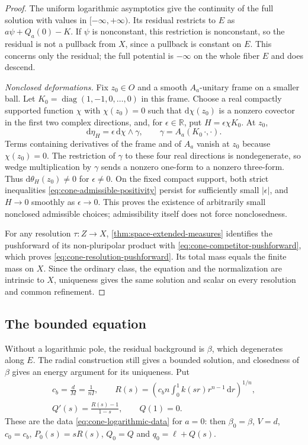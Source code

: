 \begin{proof}
The uniform logarithmic asymptotics give the continuity of the full solution with values in $[-\infty,+\infty)$. Its residual restricts to $E$ as $a\psi+Q_a(0)-K$. If $\psi$ is nonconstant, this restriction is nonconstant, so the residual is not a pullback from $X$, since a pullback is constant on $E$. This concerns only the residual; the full potential is $-\infty$ on the whole fiber $E$ and does descend.

\emph{Nonclosed deformations.} Fix $z_0\in O$ and a smooth $A_a$-unitary frame on a smaller ball. Let $K_0=\operatorname{diag}(1,-1,0,\ldots,0)$ in this frame. Choose a real compactly supported function $\chi$ with $\chi(z_0)=0$ such that $\mathrm{d}\chi(z_0)$ is a nonzero covector in the first two complex directions, and, for $\epsilon\in\mathbb R$, put $H=\epsilon\chi K_0$. At $z_0$,
\[
\mathrm{d}\eta_H=\epsilon\,\mathrm{d}\chi\wedge\gamma,\qquad \gamma=A_a(K_0\,\cdot,\cdot).
\]
Terms containing derivatives of the frame and of $A_a$ vanish at $z_0$ because $\chi(z_0)=0$. The restriction of $\gamma$ to these four real directions is nondegenerate, so wedge multiplication by $\gamma$ sends a nonzero one-form to a nonzero three-form. Thus $\mathrm{d}\theta_H(z_0)\ne0$ for $\epsilon\ne0$. On the fixed compact support, both strict inequalities \eqref{eq:cone-admissible-positivity} persist for sufficiently small $|\epsilon|$, and $H\to0$ smoothly as $\epsilon\to0$. This proves the existence of arbitrarily small nonclosed admissible choices; admissibility itself does not force nonclosedness.

For any resolution $\tau\colon Z\to X$, \cref{thm:space-extended-measures} identifies the pushforward of its non-pluripolar product with \eqref{eq:cone-competitor-pushforward}, which proves \eqref{eq:cone-resolution-pushforward}. Its total mass equals the finite mass on $X$. Since the ordinary class, the equation and the normalization are intrinsic to $X$, uniqueness gives the same solution and scalar on every resolution and common refinement.
\end{proof}

\subsection{The bounded equation}

Without a logarithmic pole, the residual background is $\beta$, which degenerates along $E$. The radial construction still gives a bounded solution, and closedness of $\beta$ gives an energy argument for its uniqueness. Put
\begin{equation}\label{eq:cone-bounded-data}
\begin{gathered}
c_b=\frac dM=\frac1{nI},\qquad R(s)=\left(c_bn\int_0^1 k(sr)r^{n-1}\,\mathrm{d} r\right)^{1/n},\\
Q'(s)=\frac{R(s)-1}{1-s},\qquad Q(1)=0.
\end{gathered}
\end{equation}
These are the data \eqref{eq:cone-logarithmic-data} for $a=0$: then $\beta_0=\beta$, $V=d$, $c_0=c_b$, $P_0(s)=sR(s)$, $Q_0=Q$ and $q_0=\ell+Q(s)$.

